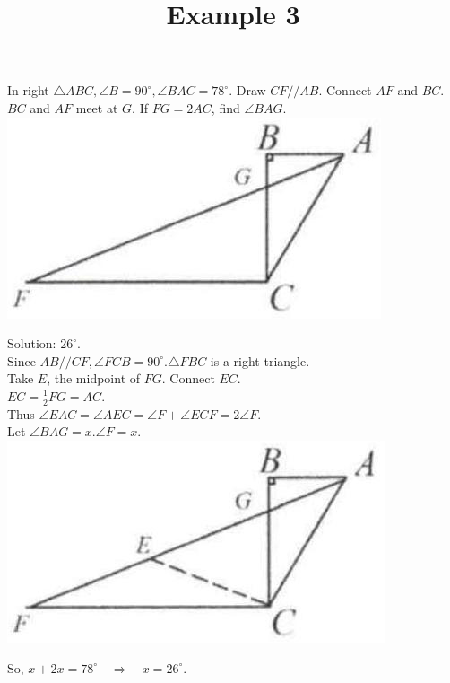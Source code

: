 \documentclass{article}
\title{Example 3}
\date{}
\begin{document}
\maketitle

In right \(\triangle A B C, \angle B=90^{\circ}, \angle B A C=78^{\circ}\). Draw \(C F / / A B\). Connect \(A F\) and \(B C\). \(B C\) and \(A F\) meet at \(G\). If \(F G=2 A C\), find \(\angle B A G\).\\
\centering
\includegraphics[width=\textwidth]{images/problem_image_1.jpg}


Solution: \(26^{\circ}\).\\
Since \(A B / / C F, \angle F C B=90^{\circ} . \triangle F B C\) is a right triangle.\\
Take \(E\), the midpoint of \(F G\). Connect \(E C\).\\
\(E C=\frac{1}{2} F G=A C\).\\
Thus \(\angle E A C=\angle A E C=\angle F+\angle E C F=2 \angle F\).\\
Let \(\angle B A G=x . \angle F=x\).\\
\centering
\includegraphics[width=\textwidth]{images/reasoning_image_1.jpg}

So, \(x+2 x=78^{\circ} \quad \Rightarrow \quad x=26^{\circ}\).\\
\end{document}
